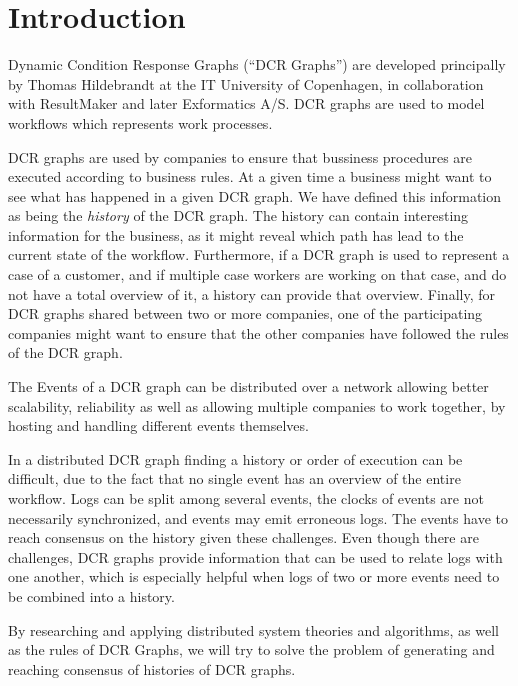 \chapter{Introduction}
	Dynamic Condition Response Graphs  (“DCR Graphs”) are developed principally by Thomas Hildebrandt at the IT University of Copenhagen, in collaboration with ResultMaker and later Exformatics A/S. DCR graphs are used to model workflows which represents work processes.
	
	\newpar DCR graphs are used by companies to ensure that bussiness procedures are executed according to business rules. At a given time a business might want to see what has happened in a given DCR graph. We have defined this information as being the \textit{history} of the DCR graph. The history can contain interesting information for the business, as it might reveal which path has lead to the current state of the workflow. Furthermore, if a DCR graph is used to represent a case of a customer, and if multiple case workers are working on that case, and do not have a total overview of it, a history can provide that overview. Finally, for DCR graphs shared between two or more companies, one of the participating companies might want to ensure that the other companies have followed the rules of the DCR graph.
	
	\newpar The Events of a DCR graph can be distributed over a network allowing better scalability, reliability as well as allowing multiple companies to work together, by hosting and handling different events themselves. 
	
	\newpar In a distributed DCR graph finding a history or order of execution can be difficult, due to the fact that no single event has an overview of the entire workflow. Logs can be split among several events, the clocks of events are not necessarily synchronized, and events may emit erroneous logs. The events have to reach consensus on the history given these challenges. Even though there are challenges, DCR graphs provide information that can be used to relate logs with one another, which is especially helpful when logs of two or more events need to be combined into a history.
	
	\newpar By researching and applying distributed system theories and algorithms, as well as the rules of DCR Graphs, we will try to solve the problem of generating and reaching consensus of histories of DCR graphs. 